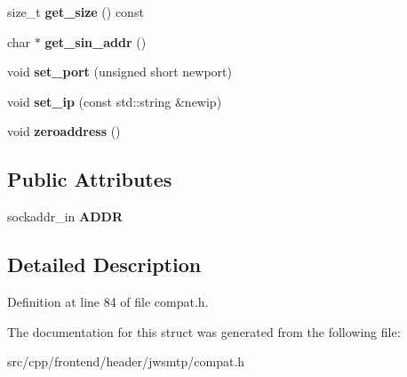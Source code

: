 \begin{DoxyCompactItemize}
\item 
\hypertarget{structjwsmtp_1_1SOCKADDR__IN_a2fa14b8fb4f89917920c8f48db1af9e5}{size\-\_\-t {\bfseries get\-\_\-size} () const }\label{structjwsmtp_1_1SOCKADDR__IN_a2fa14b8fb4f89917920c8f48db1af9e5}

\item 
\hypertarget{structjwsmtp_1_1SOCKADDR__IN_a85af8047968eec8bb4d534f30cb120ba}{char $\ast$ {\bfseries get\-\_\-sin\-\_\-addr} ()}\label{structjwsmtp_1_1SOCKADDR__IN_a85af8047968eec8bb4d534f30cb120ba}

\item 
\hypertarget{structjwsmtp_1_1SOCKADDR__IN_aa64b304782ebcec318d12b6e4137de0b}{void {\bfseries set\-\_\-port} (unsigned short newport)}\label{structjwsmtp_1_1SOCKADDR__IN_aa64b304782ebcec318d12b6e4137de0b}

\item 
\hypertarget{structjwsmtp_1_1SOCKADDR__IN_aa5a98e0ccbe4c286b944de1bcc75d9c5}{void {\bfseries set\-\_\-ip} (const std\-::string \&newip)}\label{structjwsmtp_1_1SOCKADDR__IN_aa5a98e0ccbe4c286b944de1bcc75d9c5}

\item 
\hypertarget{structjwsmtp_1_1SOCKADDR__IN_a3c825338ac7bd9b2d0dcf7514dfaaa2a}{void {\bfseries zeroaddress} ()}\label{structjwsmtp_1_1SOCKADDR__IN_a3c825338ac7bd9b2d0dcf7514dfaaa2a}

\end{DoxyCompactItemize}
\subsection*{Public Attributes}
\begin{DoxyCompactItemize}
\item 
\hypertarget{structjwsmtp_1_1SOCKADDR__IN_ad23415107871375647977a3ac0a897a4}{sockaddr\-\_\-in {\bfseries A\-D\-D\-R}}\label{structjwsmtp_1_1SOCKADDR__IN_ad23415107871375647977a3ac0a897a4}

\end{DoxyCompactItemize}


\subsection{Detailed Description}


Definition at line 84 of file compat.\-h.



The documentation for this struct was generated from the following file\-:\begin{DoxyCompactItemize}
\item 
src/cpp/frontend/header/jwsmtp/compat.\-h\end{DoxyCompactItemize}
